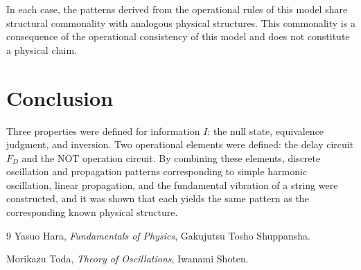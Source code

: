 \documentclass[12pt,a4paper]{article}
\begin{document}
In each case, the patterns derived from the operational rules of this model share structural commonality with analogous physical structures. This commonality is a consequence of the operational consistency of this model and does not constitute a physical claim.

\section{Conclusion}

Three properties were defined for information $I$: the null state, equivalence judgment, and inversion. Two operational elements were defined: the delay circuit $F_D$ and the NOT operation circuit. By combining these elements, discrete oscillation and propagation patterns corresponding to simple harmonic oscillation, linear propagation, and the fundamental vibration of a string were constructed, and it was shown that each yields the same pattern as the corresponding known physical structure.

\begin{thebibliography}{9}
  Yasuo Hara,
  \textit{Fundamentals of Physics},
  Gakujutsu Tosho Shuppansha.

  Morikazu Toda,
  \textit{Theory of Oscillations},
  Iwanami Shoten.
\end{thebibliography}
\end{document}
